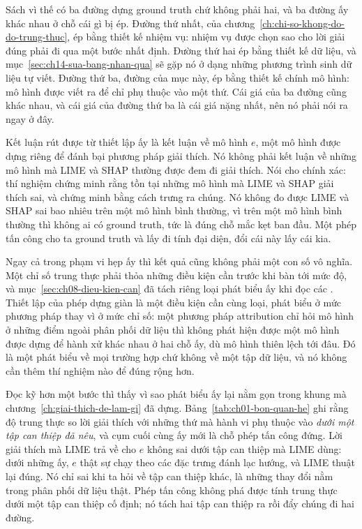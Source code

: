 %
Sách vì thế có ba đường dựng ground truth chứ không phải hai, và ba đường ấy
khác nhau ở chỗ cái gì bị ép. Đường thứ nhất, của
chương~\ref{ch:chi-so-khong-do-do-trung-thuc}, ép bằng thiết kế nhiệm vụ: nhiệm
vụ được chọn sao cho lời giải đúng phải đi qua một bước nhất định. Đường thứ
hai ép bằng thiết kế dữ liệu, và mục~\ref{sec:ch14-sua-bang-nhan-qua} sẽ gặp nó
ở dạng những phương trình sinh dữ liệu tự viết. Đường thứ ba, đường của mục
này, ép bằng thiết kế chính mô hình: mô hình được viết ra để chỉ phụ thuộc vào
một thứ. Cái giá của ba đường cũng khác nhau, và cái giá của đường thứ ba là
cái giá nặng nhất, nên nó phải nói ra ngay ở đây.

%
Kết luận rút được từ thiết lập ấy là kết luận về mô hình $e$, một mô hình được
dựng riêng để đánh bại phương pháp giải thích. Nó không phải kết luận về những
mô hình mà LIME và SHAP thường được đem đi giải thích. Nói cho chính xác: thí
nghiệm chứng minh rằng tồn tại những mô hình mà LIME và SHAP giải thích sai, và
chứng minh bằng cách trưng ra chúng. Nó không đo được LIME và SHAP sai bao
nhiêu trên một mô hình bình thường, vì trên một mô hình bình thường thì không
ai có ground truth, tức là đúng chỗ mắc kẹt ban đầu. Một phép tấn công cho ta
ground truth và lấy đi tính đại diện, đổi cái này lấy cái kia.

Ngay cả trong phạm vi hẹp ấy thì kết quả cũng không phải một con số vô nghĩa.
Một chỉ số trung thực phải thỏa những điều kiện cần trước khi bàn tới mức độ,
và mục~\ref{sec:ch08-dieu-kien-can} đã tách riêng loại phát biểu ấy khi đọc các
. Thiết lập của phép dựng giàn
là một điều kiện cần cùng loại, phát biểu ở mức phương pháp thay vì ở mức chỉ
số: một phương pháp attribution chỉ hỏi mô hình ở những điểm ngoài phân phối dữ
liệu thì không phát hiện được một mô hình được dựng để hành xử khác nhau ở hai
chỗ ấy, dù mô hình thiên lệch tới đâu. Đó là một phát biểu về mọi trường hợp
chứ không về một tập dữ liệu, và nó không cần thêm thí nghiệm nào để đúng rộng
hơn.

%
Đọc kỹ hơn một bước thì thấy vì sao phát biểu ấy lại nằm gọn trong khung mà
chương~\ref{ch:giai-thich-de-lam-gi} đã dựng. Bảng~\ref{tab:ch01-bon-quan-he}
ghi rằng độ trung thực so lời giải thích với những thứ mà hành vi phụ thuộc vào
\emph{dưới một tập can thiệp đã nêu}, và cụm cuối cùng ấy mới là chỗ phép tấn
công đứng. Lời giải thích mà LIME trả về cho $e$ không sai dưới tập can thiệp
mà LIME dùng: dưới những  ấy, $e$ thật sự chạy
theo các đặc trưng đánh lạc hướng, và LIME thuật lại đúng. Nó chỉ sai khi ta
hỏi về tập can thiệp khác, là những thay đổi nằm trong phân phối dữ liệu thật.
Phép tấn công không phá được tính trung thực dưới một tập can thiệp cố định; nó
tách hai tập can thiệp ra rồi đẩy chúng đi hai đường.

